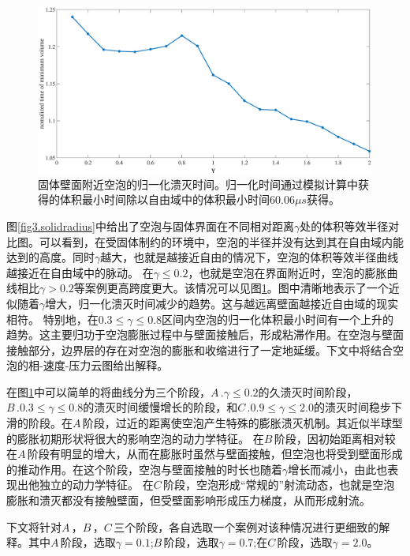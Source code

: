 \begin{figure}[H]
    \centering
    \includegraphics[width=0.9\linewidth]{img/fig3.solidnmlzedcollapsetime.eps}
    \caption[固体壁面附近空泡的归一化溃灭时间]{固体壁面附近空泡的归一化溃灭时间。归一化时间通过模拟计算中获得的体积最小时间除以自由域中的体积最小时间60.06$\mu s $获得。}
    \label{fig3.solidcolltime}
\end{figure}

图\ref{fig3.solidradius}中给出了空泡与固体界面在不同相对距离$\gamma$处的体积等效半径对比图。可以看到，在受固体制约的环境中，空泡的半径并没有达到其在自由域内能达到的高度。同时$\gamma$越大，也就是越接近自由的情况下，空泡的体积等效半径曲线越接近在自由域中的脉动。
在$\gamma\leq 0.2$，也就是空泡在界面附近时，空泡的膨胀曲线相比$\gamma> 0.2$等案例更高跨度更大。该情况可以见图\ref{fig3.solidcolltime}。图中清晰地表示了一个近似随着$\gamma$增大，归一化溃灭时间减少的趋势。这与越远离壁面越接近自由域的现实相符。
特别地，在$0.3\leq \gamma\leq0.8$区间内空泡的归一化体积最小时间有一个上升的趋势。这主要归功于空泡膨胀过程中与壁面接触后，形成粘滞作用。在空泡与壁面接触部分，边界层的存在对空泡的膨胀和收缩进行了一定地延缓。下文中将结合空泡的相-速度-压力云图给出解释。

在图\ref{fig3.solidcolltime}中可以简单的将曲线分为三个阶段，$A\,.$$\gamma\leq 0.2$的久溃灭时间阶段，$B\,. 0.3\leq \gamma\leq0.8$的溃灭时间缓慢增长的阶段，和$C\,.0.9\leq \gamma\leq2.0$的溃灭时间稳步下滑的阶段。在$A\,$阶段，过近的距离使空泡产生特殊的膨胀溃灭机制。其近似半球型的膨胀初期形状将很大的影响空泡的动力学特征。
在$B\,$阶段，因初始距离相对较在$A\,$阶段有明显的增大，从而在膨胀时虽然与壁面接触，但空泡也将受到壁面形成的推动作用。在这个阶段，空泡与壁面接触的时长也随着$\gamma$增长而减小，由此也表现出他独立的动力学特征。
在$C\,$阶段，空泡形成“常规的”射流动态，也就是空泡膨胀和溃灭都没有接触壁面，但受壁面影响形成压力梯度，从而形成射流。

下文将针对$A\,$，$B\,$，$C\,$三个阶段，各自选取一个案例对该种情况进行更细致的解释。其中$A\,$阶段，选取$\gamma=0.1$;$B\,$阶段，选取$\gamma=0.7$;在$C\,$阶段，选取$\gamma=2.0$。


